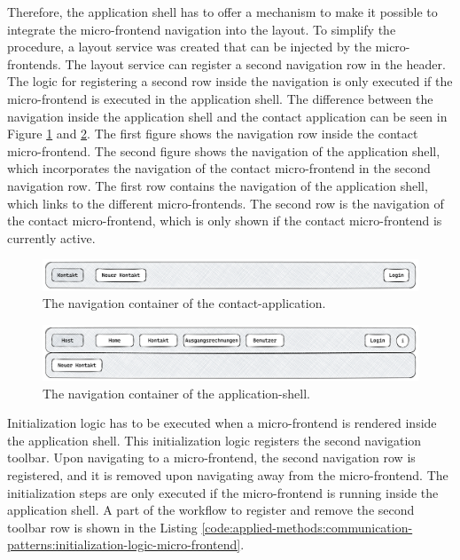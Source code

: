 \noindent Therefore, the application shell has to offer a mechanism to make it possible to integrate the micro-frontend navigation into the layout. To simplify the procedure, a layout service was created that can be injected by the micro-frontends. The layout service can register a second navigation row in the header. The logic for registering a second row inside the navigation is only executed if the micro-frontend is executed in the application shell. The difference between the navigation inside the application shell and the contact application can be seen in Figure \ref{fig:applied-methods:communication-patterns:contact-application-header} and \ref{fig:applied-methods:communication-patterns:application-shell-header}. The first figure shows the navigation row inside the contact micro-frontend. The second figure shows the navigation of the application shell, which incorporates the navigation of the contact micro-frontend in the second navigation row. The first row contains the navigation of the application shell, which links to the different micro-frontends. The second row is the navigation of the contact micro-frontend, which is only shown if the contact micro-frontend is currently active.

\ifshowImages
  \begin{figure}[H]
  \centering
  \includegraphics[width=1\linewidth]{images/applied-methods/communication-patterns/contact-header.png}
  \caption{The navigation container of the contact-application.}\label{fig:applied-methods:communication-patterns:contact-application-header}
  \end{figure}
\fi

\ifshowImages
  \begin{figure}[H]
  \centering
  \includegraphics[width=1\linewidth]{images/applied-methods/communication-patterns/host-contact-header.png}
  \caption{The navigation container of the application-shell.}\label{fig:applied-methods:communication-patterns:application-shell-header}
  \end{figure}
\fi

\noindent Initialization logic has to be executed when a micro-frontend is rendered inside the application shell. This initialization logic registers the second navigation toolbar. Upon navigating to a micro-frontend, the second navigation row is registered, and it is removed upon navigating away from the micro-frontend. The initialization steps are only executed if the micro-frontend is running inside the application shell. A part of the workflow to register and remove the second toolbar row is shown in the Listing \ref{code:applied-methods:communication-patterns:initialization-logic-micro-frontend}.

